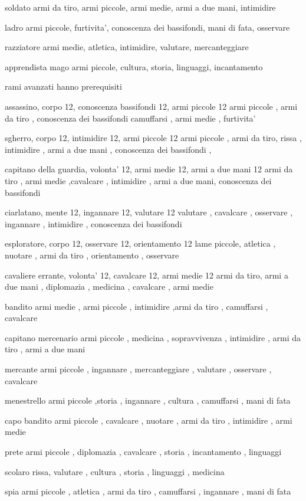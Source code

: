 \documentclass[12pt,a4paper,twoside,openany,twocolumn]{book}
\begin{document}
soldato
armi da tiro, armi piccole, armi medie, armi a due mani, intimidire

ladro
armi piccole, furtivita', conoscenza dei bassifondi, mani di fata, osservare

razziatore
armi medie, atletica, intimidire, valutare,  mercanteggiare

apprendista mago
armi piccole, cultura,  storia, linguaggi, incantamento


rami avanzati hanno prerequisiti


assassino, corpo 12, conoscenza bassifondi 12, armi piccole 12
armi piccole , armi da tiro , conoscenza dei bassifondi  camuffarsi , armi medie , furtivita' 

sgherro, corpo 12, intimidire 12, armi piccole 12
armi piccole , armi da tiro, rissa , intimidire , armi a due mani , conoscenza dei bassifondi ,

capitano della guardia, volonta' 12, armi medie 12, armi a due mani 12
armi da tiro , armi medie ,cavalcare , intimidire , armi a due mani, conoscenza dei bassifondi 

ciarlatano, mente 12, ingannare 12, valutare 12
valutare , cavalcare , osservare , ingannare , intimidire , conoscenza dei bassifondi 

esploratore, corpo 12, osservare 12, orientamento 12
lame piccole, atletica ,  nuotare , armi da tiro , orientamento , osservare 

cavaliere errante, volonta' 12, cavalcare 12, armi medie 12
armi da tiro, armi a due mani , diplomazia , medicina , cavalcare , armi medie 

bandito
armi medie , armi piccole , intimidire ,armi da tiro  , camuffarsi , cavalcare 

capitano mercenario
armi piccole , medicina , sopravvivenza , intimidire , armi da tiro , armi a due mani 

mercante
armi piccole , ingannare , mercanteggiare , valutare , osservare , cavalcare 

menestrello
armi piccole ,storia , ingannare , cultura , camuffarsi ,  mani di fata 

capo bandito
armi piccole , cavalcare , nuotare , armi da tiro , intimidire , armi medie 

prete
armi piccole , diplomazia , cavalcare ,  storia , incantamento , linguaggi 

scolaro
rissa, valutare  , cultura , storia , linguaggi , medicina 

spia
armi piccole , atletica , armi da tiro ,  camuffarsi , ingannare , mani di fata 
\end{document}
